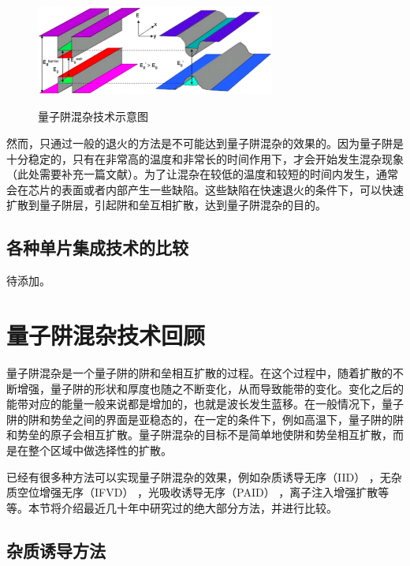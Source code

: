 \documentclass[oneside]{ZJUthesis}
\begin{document}
\begin{figure}[!h]
  \centering
  \includegraphics[width=0.7\textwidth]{./Pictures/qwi.eps}\\
  \caption{量子阱混杂技术示意图}
  \label{fig_qwi}
\end{figure}

然而，只通过一般的退火的方法是不可能达到量子阱混杂的效果的。因为量子阱是十分稳定的，只有在非常高的温度和非常长的时间作用下，才会开始发生混杂现象（此处需要补充一篇文献）。为了让混杂在较低的温度和较短的时间内发生，通常会在芯片的表面或者内部产生一些缺陷。这些缺陷在快速退火的条件下，可以快速扩散到量子阱层，引起阱和垒互相扩散，达到量子阱混杂的目的。

\subsection{各种单片集成技术的比较}

待添加。

\section{量子阱混杂技术回顾}

量子阱混杂是一个量子阱的阱和垒相互扩散的过程。在这个过程中，随着扩散的不断增强，量子阱的形状和厚度也随之不断变化，从而导致能带的变化。变化之后的能带对应的能量一般来说都是增加的，也就是波长发生蓝移。在一般情况下，量子阱的阱和势垒之间的界面是亚稳态的，在一定的条件下，例如高温下，量子阱的阱和势垒的原子会相互扩散。量子阱混杂的目标不是简单地使阱和势垒相互扩散，而是在整个区域中做选择性的扩散。

已经有很多种方法可以实现量子阱混杂的效果，例如杂质诱导无序（IID） \cite{holonyak1998impurity-IID} ，无杂质空位增强无序（IFVD） \cite{si1998area-IFVD}，光吸收诱导无序（PAID） \cite{mckee1997monolithic-PAID}，离子注入增强扩散\cite{charbonneau1998photonic-implantation}等等。本节将介绍最近几十年中研究过的绝大部分方法，并进行比较。

\subsection{杂质诱导方法}
\end{document}
